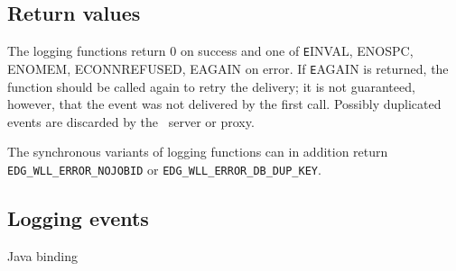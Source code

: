 \subsection{Return values}
The logging functions return 0 on success and one of {\texttt EINVAL,
ENOSPC, ENOMEM, ECONNREFUSED, EAGAIN} on error. If {\texttt EAGAIN} is
returned, the function should be called again to retry the delivery;
it is not guaranteed, however, that the event was not delivered by the
first call. Possibly duplicated events are discarded by the \LB\
server or proxy.

The synchronous variants of logging functions can in addition return
\verb'EDG_WLL_ERROR_NOJOBID' or \verb'EDG_WLL_ERROR_DB_DUP_KEY'.

\subsection{Logging events}




Java binding
